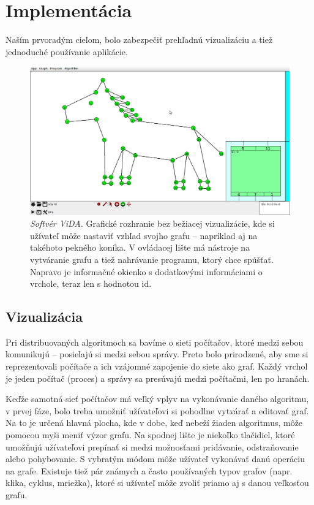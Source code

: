 \section{Implementácia}

Naším prvoradým cieľom, bolo zabezpečiť prehľadnú vizualizáciu a tiež jednoduché
používanie aplikácie.

\noindent
\begin{figure}
\centering
\includegraphics[width=2.01\columnwidth]{konik-je-uzasny.png}
\caption{\emph{Softvér ViDA.} Grafické rozhranie bez bežiacej vizualizácie, kde si užívateľ môže
nastaviť vzhľad svojho grafu -- napríklad aj na takéhoto pekného koníka. V ovládacej lište má
nástroje na vytváranie grafu a tiež nahrávanie programu, ktorý chce spúšťať. Napravo je informačné
okienko s dodatkovými informáciami o vrchole, teraz len s hodnotou id.}
\label{img:historia} 
\end{figure}

\subsection{Vizualizácia}

Pri distribuovaných algoritmoch sa bavíme o sieti počítačov, ktoré medzi sebou komunikujú --
posielajú si medzi sebou správy. Preto bolo prirodzené, aby sme si reprezentovali počítače a ich
vzájomné zapojenie do siete ako graf. Každý vrchol je jeden počítač (proces) a správy sa presúvajú
medzi počítačmi, len po hranách.

Keďže samotná sieť počítačov má veľký vplyv na vykonávanie daného algoritmu, v prvej fáze, bolo
treba umožniť užívateľovi si pohodlne vytvárať a editovať graf. Na to je určená hlavná
plocha, kde v dobe, keď nebeží žiaden algoritmus, môže pomocou myši meniť výzor grafu. Na spodnej
lište je niekoľko tlačidiel, ktoré umožňujú užívateľovi prepínať si medzi možnosťami pridávanie,
odstraňovanie alebo pohybovanie. S vybratým módom môže užívateľ vykonávať danú operáciu na grafe.
Existuje tiež pár známych a často používaných typov grafov (napr. klika, cyklus, mriežka), ktoré si užívateľ môže zvoliť priamo
aj s danou veľkosťou grafu.

